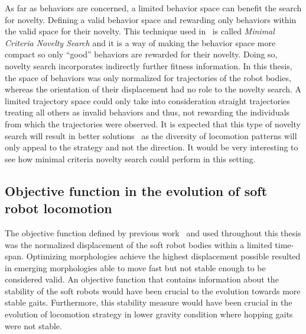 As far as behaviors are concerned, a limited behavior space can benefit the search for novelty. Defining a valid behavior space and rewarding only behaviors within the valid space for their novelty. This technique used in~\citep{lehman2011abandoning} is called \emph{Minimal Criteria Novelty Search} and it is a way of making the behavior space more compact so only ``good'' behaviors are rewarded for their novelty. Doing so, novelty search incorporates indirectly further fitness information. In this thesis, the space of behaviors was only normalized for trajectories of the robot bodies, whereas the orientation of their displacement had no role to the novelty search. A limited trajectory space could only take into consideration straight trajectories treating all others as invalid behaviors and thus, not rewarding the individuals from which the trajectories were observed. It is expected that this type of novelty search will result in better solutions~\citep{lehman2011abandoning} as the diversity of locomotion patterns will only appeal to the strategy and not the direction. It would be very interesting to see how minimal criteria novelty search could perform in this setting.

\subsection*{Objective function in the evolution of soft robot locomotion}

The objective function defined by previous work~\citep{cheney2013unshackling} and used throughout this thesis was the normalized displacement of the soft robot bodies within a limited time-span. Optimizing morphologies achieve the highest displacement possible resulted in emerging morphologies able to move fast but not stable enough to be considered valid. An objective function that  contains information about the stability of the soft robots would have been crucial to the evolution towards more stable gaits. Furthermore, this stability measure would have been crucial in the evolution of locomotion strategy in lower gravity condition where hopping gaits were not stable.